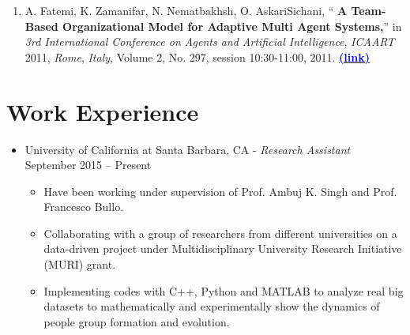 \documentclass[letter]{res}
\begin{document}
\begin{resume}
\begin{enumerate}

\item A. Fatemi, K. Zamanifar, N. Nematbakhsh, O. AskariSichani, ``
\textbf{A Team-Based Organizational Model for Adaptive Multi Agent Systems,}''
in \textit{3rd International Conference on Agents and Artificial Intelligence},
\textit{ICAART} 2011, \textit{Rome}, \textit{Italy}, Volume 2, No. 297, session
10:30-11:00, 2011.
{\href{http://ce.sharif.edu/~oaskari/publications/an_adaptive_multi_agent_systems.pdf}{\textbf{\textcolor{blue}{(link)}}}}
\end{enumerate}


\section{Work Experience}
\begin{itemize}
\item University of California at Santa Barbara, CA \newline
   - {\sl Research Assistant} \hfill September 2015 – Present\\
   \vspace{-4mm}
   \iflong
     \begin{itemize}
     \item Have been working under supervision of Prof. Ambuj K. Singh and Prof. Francesco 	Bullo.
     \item Collaborating with a group of researchers from different universities on a data-driven project under Multidisciplinary University Research Initiative (MURI) grant.
     \item Implementing codes with C++, Python and MATLAB to analyze real big datasets to mathematically and experimentally show the dynamics of people group formation and evolution.
     \end{itemize}
   \fi 
   

\end{itemize}
\end{resume}
\end{document}
